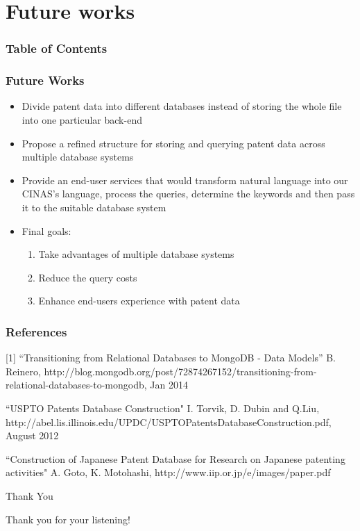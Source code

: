 \documentclass{beamer}
\begin{document}
\section{Future works}
\begin{frame}
\frametitle{Table of Contents}
\tableofcontents[currentsection]
\end{frame}

\begin{frame}
\frametitle{Future Works}
\begin{itemize}
\item Divide patent data into different databases instead of storing the whole file into one particular back-end
\item Propose a refined structure for storing and querying patent data across multiple database systems
\item Provide an end-user services that would transform natural language into our CINAS's language, process the queries, determine the keywords and then pass it to the suitable database system
\item Final goals:
\begin{enumerate}
\item Take advantages of multiple database systems
\item Reduce the query costs
\item Enhance end-users experience with patent data
\end{enumerate}
\end{itemize}
\end{frame}

\begin{frame}
\frametitle{References}
[1] ``Transitioning from Relational Databases to MongoDB - Data Models'' B. Reinero, http://blog.mongodb.org/post/72874267152/transitioning-from-relational-databases-to-mongodb, Jan 2014\par
[2] ``USPTO Patents Database Construction" I. Torvik, D. Dubin and Q.Liu, http://abel.lis.illinois.edu/UPDC/USPTOPatentsDatabaseConstruction.pdf, August 2012\par
[3] ``Construction of Japanese Patent Database for Research on Japanese patenting activities" A. Goto, K. Motohashi, http://www.iip.or.jp/e/images/paper.pdf
\end{frame}

\begin{frame}{Thank You}
\begin{center}
Thank you for your listening!
\end{center}
\end{frame}
\end{document}
